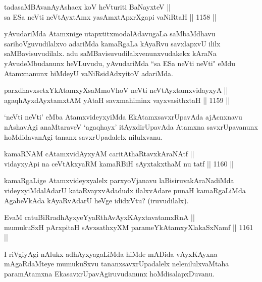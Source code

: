 \begin{shl}
tadasaMBAvanAyAshacx koV heVturiti BaNayxteV || \\
sa ESa neVti neVtAyxtAmx yasAmxtApxrXgapi vaNiRtaH \hfill || 1158 ||  
\end{shl}

\begin{artha}
yAvudariMda Atamxnige utapxtitxmodalAdavugaLa saMbaMdhavu sarihoVguvudilalxvo adariMda kamaRgaLa kAyaRvu savxlapxvU ililx saMBavisuvudilalx. adu saMBavisuvudilalxvenunxvudakekx kAraNa yAvudeMbudanunx heVLuvudu, yAvudariMda ``sa ESa neVti neVti" eMdu Atamxnanunx hiMdeyU vaNiRsidAdxyitoV adariMda.
\end{artha}

\begin{shl}
parxdhavxsetxYkAtamxyXsaMmoVhoV neVti neVtAyxtamxvidayxyA || \\
agaqhAyxdAyxtamxtAM yAtaH savxmahiminx vayxvasithxtaH \hfill || 1159 ||  
\end{shl}

\begin{artha}
`neVti neVti' eMba AtamxvideyxyiMda EkAtamxsavxrUpavAda ajAcnxnavu nAshavAgi anaMtaraveV `agaqhayx' itAyxdirUpavAda Atamxna savxrUpavanunx hoMdidavanAgi tananx savxrUpadalelx nilulxvanu.
\end{artha}


\begin{shl}
kamaRNAM cA\s \s tamxvidAyxyAM caritAthaRtavxkAraNAtf || \\
vidayxyA\s pi na ceVtAkxyaRM kamaRBiH sAyxtakxthaM nu tatf \hfill || 1160 ||  
\end{shl}

\begin{artha}
kamaRgaLige Atamxvideyxyalelx parxyoVjanavu laBisiruvakAraNadiMda videyxyiMdalAdarU kataRvayxvAdadudx ilalxvAdare punaH kamaRgaLiMda AgabeVkAda kAyaRvAdarU heVge ididxVtu? (iruvudilalx).
\end{artha}

\begin{shl}
EvaM catuBiRradhAyxyeYyaRthAvAyxKAyxtavatamxRnA || \\
mumukuSxH pArxpitaH sAvxsathxyXM parameYkAtamxyXlakaSxNamf \hfill || 1161 ||  
\end{shl}

\begin{artha}
I riVgiyAgi nAlukx adhAyxyagaLiMda hiMde mADida vAyxKAyxna mAgaRdaMteye mumukuSxvu tananxsavxrUpadalelx nelenilulxvaMtaha paramAtamxna EkasavxrUpavAgiruvudanunx hoMdisalapxDuvanu.
\end{artha}

